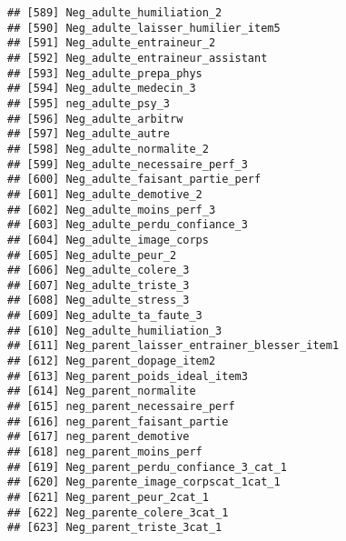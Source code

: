 \documentclass[
]{article}
\begin{document}
\begin{verbatim}
## [589] Neg_adulte_humiliation_2                                         
## [590] Neg_adulte_laisser_humilier_item5                                
## [591] Neg_adulte_entraineur_2                                          
## [592] Neg_adulte_entraineur_assistant                                  
## [593] Neg_adulte_prepa_phys                                            
## [594] Neg_adulte_medecin_3                                             
## [595] neg_adulte_psy_3                                                 
## [596] Neg_adulte_arbitrw                                               
## [597] Neg_adulte_autre                                                 
## [598] Neg_adulte_normalite_2                                           
## [599] Neg_adulte_necessaire_perf_3                                     
## [600] Neg_adulte_faisant_partie_perf                                   
## [601] Neg_adulte_demotive_2                                            
## [602] Neg_adulte_moins_perf_3                                          
## [603] Neg_adulte_perdu_confiance_3                                     
## [604] Neg_adulte_image_corps                                           
## [605] Neg_adulte_peur_2                                                
## [606] Neg_adulte_colere_3                                              
## [607] Neg_adulte_triste_3                                              
## [608] Neg_adulte_stress_3                                              
## [609] Neg_adulte_ta_faute_3                                            
## [610] Neg_adulte_humiliation_3                                         
## [611] Neg_parent_laisser_entrainer_blesser_item1                       
## [612] Neg_parent_dopage_item2                                          
## [613] Neg_parent_poids_ideal_item3                                     
## [614] Neg_parent_normalite                                             
## [615] neg_parent_necessaire_perf                                       
## [616] neg_parent_faisant_partie                                        
## [617] neg_parent_demotive                                              
## [618] neg_parent_moins_perf                                            
## [619] Neg_parent_perdu_confiance_3_cat_1                               
## [620] Neg_parente_image_corpscat_1cat_1                                
## [621] Neg_parent_peur_2cat_1                                           
## [622] Neg_parente_colere_3cat_1                                        
## [623] Neg_parent_triste_3cat_1                                         

\end{verbatim}
\end{document}
